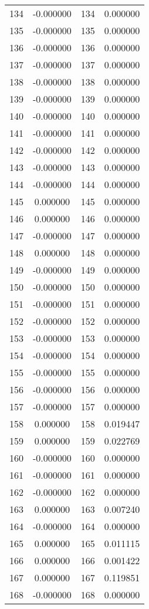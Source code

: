 \documentclass[12pt]{article}
\begin{document}
\begin{longtable}{@{}cccc@{}}
134 & -0.000000 & 134 & 0.000000 \\
135 & -0.000000 & 135 & 0.000000 \\
136 & -0.000000 & 136 & 0.000000 \\
137 & -0.000000 & 137 & 0.000000 \\
138 & -0.000000 & 138 & 0.000000 \\
139 & -0.000000 & 139 & 0.000000 \\
140 & -0.000000 & 140 & 0.000000 \\
141 & -0.000000 & 141 & 0.000000 \\
142 & -0.000000 & 142 & 0.000000 \\
143 & -0.000000 & 143 & 0.000000 \\
144 & -0.000000 & 144 & 0.000000 \\
145 & 0.000000 & 145 & 0.000000 \\
146 & 0.000000 & 146 & 0.000000 \\
147 & -0.000000 & 147 & 0.000000 \\
148 & 0.000000 & 148 & 0.000000 \\
149 & -0.000000 & 149 & 0.000000 \\
150 & -0.000000 & 150 & 0.000000 \\
151 & -0.000000 & 151 & 0.000000 \\
152 & -0.000000 & 152 & 0.000000 \\
153 & -0.000000 & 153 & 0.000000 \\
154 & -0.000000 & 154 & 0.000000 \\
155 & -0.000000 & 155 & 0.000000 \\
156 & -0.000000 & 156 & 0.000000 \\
157 & -0.000000 & 157 & 0.000000 \\
158 & 0.000000 & 158 & 0.019447 \\
159 & 0.000000 & 159 & 0.022769 \\
160 & -0.000000 & 160 & 0.000000 \\
161 & -0.000000 & 161 & 0.000000 \\
162 & -0.000000 & 162 & 0.000000 \\
163 & 0.000000 & 163 & 0.007240 \\
164 & -0.000000 & 164 & 0.000000 \\
165 & 0.000000 & 165 & 0.011115 \\
166 & 0.000000 & 166 & 0.001422 \\
167 & 0.000000 & 167 & 0.119851 \\
168 & -0.000000 & 168 & 0.000000 \\

\end{longtable}
\end{document}

